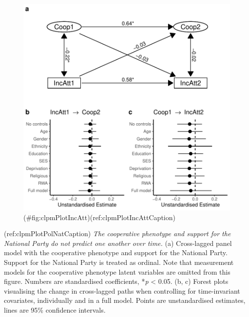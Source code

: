 \begin{appendix}
\begin{figure}
\centering
\includegraphics{manuscript_files/figure-latex/clpmPlotIncAtt-1.pdf}
\caption{(\#fig:clpmPlotIncAtt)(ref:clpmPlotIncAttCaption)}
\end{figure}

\newpage

(ref:clpmPlotPolNatCaption) \emph{The cooperative phenotype and support
for the National Party do not predict one another over time.} (a)
Cross-lagged panel model with the cooperative phenotype and support for
the National Party. Support for the National Party is treated as
ordinal. Note that measurement models for the cooperative phenotype
latent variables are omitted from this figure. Numbers are standardised
coefficients, *\emph{p} \textless{} 0.05. (b, c) Forest plots
visualising the change in cross-lagged paths when controlling for
time-invariant covariates, individually and in a full model. Points are
unstandardised estimates, lines are 95\% confidence intervals.


\end{appendix}

